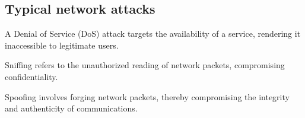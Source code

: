 \subsection{Typical network attacks}
\begin{definition}
    A Denial of Service (DoS) attack targets the availability of a service, rendering it inaccessible to legitimate users.
\end{definition}
\begin{definition}
    Sniffing refers to the unauthorized reading of network packets, compromising confidentiality.
\end{definition}
\begin{definition}
    Spoofing involves forging network packets, thereby compromising the integrity and authenticity of communications.
\end{definition}